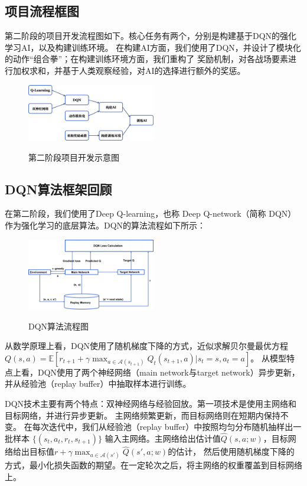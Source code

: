 \documentclass{article}
\begin{document}
\subsection{项目流程框图}
第二阶段的项目开发流程图如下。核心任务有两个，分别是构建基于DQN的强化学习AI，以及构建训练环境。
在构建AI方面，我们使用了DQN，并设计了模块化的动作“组合拳”；在构建训练环境方面，我们重构了
奖励机制，对各战场要素进行加权求和，并基于人类观察经验，对AI的选择进行额外的奖惩。
\begin{figure}[H]
	\centering
	{\includegraphics[width=0.5\textwidth]{image//开发流程图.png}} 
	\caption{第二阶段项目开发示意图} \label{} 
\end{figure}

\subsection{DQN算法框架回顾}
在第二阶段，我们使用了Deep Q-learning，也称 Deep Q-network（简称 DQN）
作为强化学习的底层算法。DQN的算法流程如下所示：
\begin{figure}[H]
	\centering
	{\includegraphics[width=0.5\textwidth]{image//DQN结构.png}} 
	\caption{DQN算法流程图} \label{} 
\end{figure}

从数学原理上看，DQN使用了随机梯度下降的方式，近似求解贝尔曼最优方程
$Q(s,a) = \mathbb{E}\left[ r_{t+1} + \gamma \mathop{\max}_{a\in \mathcal{A}(s_{t+1})} Q_t(s_{t+1},a) \Big| s_t=s,a_t=a \right]$。
从模型特点上看，DQN使用了两个神经网络（main network与target network）异步更新，
并从经验池（replay buffer）中抽取样本进行训练。

DQN技术主要有两个特点：双神经网络与经验回放。第一项技术是使用主网络和目标网络，并进行异步更新。
主网络频繁更新，而目标网络则在短期内保持不变。
在每次迭代中，我们从经验池（replay buffer）中按照均匀分布随机抽样出一批样本 $\{(s_t,a_t,r_t,s_{t+1})\}$
输入主网络。主网络给出估计值$\hat{Q}(s,a;w)$，目标网络给出目标值$r + \gamma \mathop{\max}_{a\in \mathcal{A}(s')}\hat{Q}(s',a;w)$的估计，
然后使用随机梯度下降的方式，最小化损失函数的期望。在一定轮次之后，将主网络的权重覆盖到目标网络上。 
\end{document}
